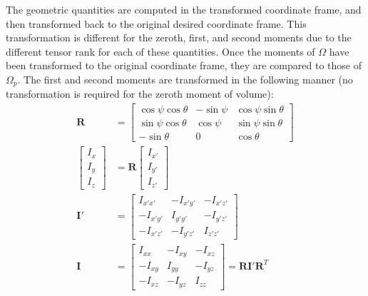 The geometric quantities are computed in the transformed coordinate frame, and then transformed back to the original desired coordinate frame. This transformation is different for the zeroth, first, and second moments due to the different tensor rank for each of these quantities. Once the moments of $\Omega$ have been transformed to the original coordinate frame, they are compared to those of $\Omega_p$. The first and second moments are transformed in the following manner (no transformation is required for the zeroth moment of volume):
\begin{align}
\bm{R} &= \left[\begin{array} {ccc} {\cos\psi\cos\theta} & {-\sin\psi} & {\cos\psi\sin\theta}\\ {\sin\psi\cos\theta} & {\cos\psi} & {\sin\psi\sin\theta} \\
{-\sin\theta} & {0} & {\cos\theta}\end{array} \right] \\
\left[\begin{array} {ccc} {I_x} \\ {I_y} \\ {I_z} \end{array} \right] &= \bm{R} \left[\begin{array} {ccc} {I_{x'}} \\ {I_{y'}} \\ {I_{z'}} \end{array} \right]\\
\bm{I}' &= \left[\begin{array} {ccc} {I_{x'x'}} & {-I_{x'y'}} & {-I_{x'z'}}\\ {-I_{x'y'}} & {I_{y'y'}} & {-I_{y'z'}} \\ -{I_{x'z'}} & {-I_{y'z'}} & {I_{z'z'}} \end{array} \right] \\
\bm{I} &= \left[\begin{array} {ccc} {I_{xx}} & {-I_{xy}} & {-I_{xz}}\\ {-I_{xy}} & {I_{yy}} & {-I_{yz}} \\ -{I_{xz}} & {-I_{yz}} & {I_{zz}} \end{array} \right] = \bm{R}\bm{I}'\mathbf{R}^T
\end{align}

